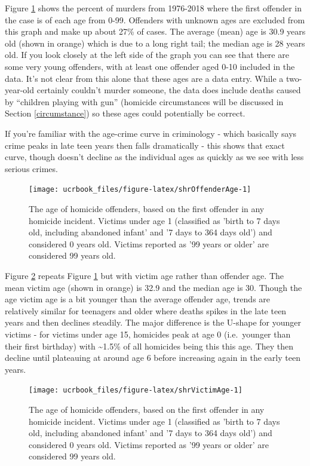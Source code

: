 \documentclass[
  12pt,
  openany]{book}
\begin{document}
Figure \ref{fig:shrOffenderAge} shows the percent of murders from 1976-2018 where the first offender in the case is of each age from 0-99. Offenders with unknown ages are excluded from this graph and make up about 27\% of cases. The average (mean) age is 30.9 years old (shown in orange) which is due to a long right tail; the median age is 28 years old. If you look closely at the left side of the graph you can see that there are some very young offenders, with at least one offender aged 0-10 included in the data. It's not clear from this alone that these ages are a data entry. While a two-year-old certainly couldn't murder someone, the data does include deaths caused by ``children playing with gun'' (homicide circumstances will be discussed in Section \ref{circumstance}) so these ages could potentially be correct.

If you're familiar with the age-crime curve in criminology - which basically says crime peaks in late teen years then falls dramatically - this shows that exact curve, though doesn't decline as the individual ages as quickly as we see with less serious crimes.

\begin{figure}

{\centering \texttt{[image: ucrbook\_files/figure-latex/shrOffenderAge-1]} 

}

\caption{The age of homicide offenders, based on the first offender in any homicide incident. Victims under age 1 (classified as 'birth to 7 days old, including abandoned infant' and '7 days to 364 days old') and considered 0 years old. Victims reported as '99 years or older' are considered 99 years old.}\label{fig:shrOffenderAge}
\end{figure}

Figure \ref{fig:shrVictimAge} repeats Figure \ref{fig:shrOffenderAge} but with victim age rather than offender age. The mean victim age (shown in orange) is 32.9 and the median age is 30. Though the age victim age is a bit younger than the average offender age, trends are relatively similar for teenagers and older where deaths spikes in the late teen years and then declines steadily. The major difference is the U-shape for younger victims - for victims under age 15, homicides peak at age 0 (i.e.~younger than their first birthday) with \textasciitilde1.5\% of all homicides being this this age. They then decline until plateauing at around age 6 before increasing again in the early teen years.

\begin{figure}

{\centering \texttt{[image: ucrbook\_files/figure-latex/shrVictimAge-1]} 

}

\caption{The age of homicide offenders, based on the first offender in any homicide incident. Victims under age 1 (classified as 'birth to 7 days old, including abandoned infant' and '7 days to 364 days old') and considered 0 years old. Victims reported as '99 years or older' are considered 99 years old.}\label{fig:shrVictimAge}
\end{figure}
\end{document}
